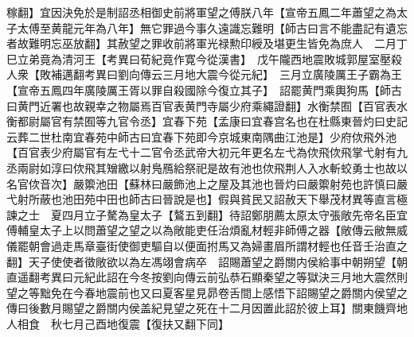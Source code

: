 稼翻】宜因決免於是制詔丞相御史前將軍望之傅朕八年【宣帝五鳳二年蕭望之為太子太傅至黄龍元年為八年】無它罪過今事久遠識忘難明【師古曰言不能盡記有遺忘者故難明忘巫放翻】其赦望之罪收前將軍光禄勲印綬及堪更生皆免為庶人　二月丁巳立弟竟為清河王【考異曰荀紀竟作寛今從漢書】　戊午隴西地震敗城郭屋室壓殺人衆【敗補邁翻考異曰劉向傳云三月地大震今從元紀】　三月立廣陵厲王子霸為王【宣帝五鳳四年廣陵厲王胥以罪自殺國除今復立其子】　詔罷黄門乘輿狗馬【師古曰黄門近署也故親幸之物屬焉百官表黄門寺屬少府乘繩證翻】水衡禁囿【百官表水衡都尉屬官有禁囿等九官令丞】宜春下苑【孟康曰宜春宫名也在杜縣東晉灼曰史記云葬二世杜南宜春苑中師古曰宜春下苑即今京城東南隅曲江池是】少府佽飛外池【百官表少府屬官有左弋十二官令丞武帝大初元年更名左弋為佽飛佽飛掌弋射有九丞兩尉如淳曰佽飛其矰繳以射鳬鴈給祭祀是故有池也佽飛荆人入水斬蛟勇士也故以名官佽音次】嚴籞池田【蘇林曰嚴飾池上之屋及其池也晉灼曰嚴籞射苑也許慎曰嚴弋射所蔽也池田苑中田也師古曰晉說是也】假與貧民又詔赦天下舉茂材異等直言極諫之士　夏四月立子驁為皇太子【鷔五到翻】待詔鄭朋薦太原太守張敞先帝名臣宜傅輔皇太子上以問蕭望之望之以為敞能吏任治煩亂材輕非師傅之器【敞傳云敝無威儀罷朝會過走馬章臺街使御吏驅自以便面拊馬又為婦畫眉所謂材輕也任音壬治直之翻】天子使使者徵敞欲以為左馮翊會病卒　詔賜蕭望之爵關内侯給事中朝朔望【朝直遥翻考異曰元紀此詔在今冬按劉向傳云前弘恭石顯秦望之等獄決三月地大震然則望之等黜免在今春地震前也又曰夏客星見昴卷舌間上感悟下詔賜望之爵關内侯望之傳曰後數月賜望之爵關内侯盖紀見望之死在十二月因置此詔於彼上耳】關東饑齊地人相食　秋七月己酉地復震【復扶又翻下同】

